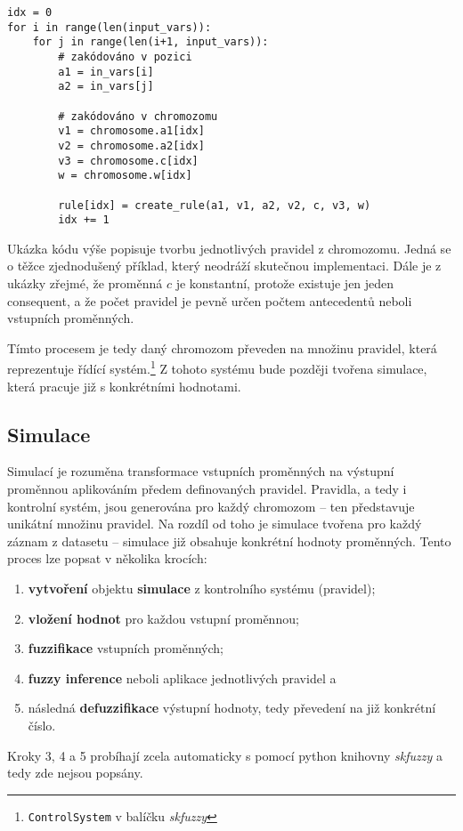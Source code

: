 \documentclass{article}
\begin{document}
\begin{listing}[H]
\begin{verbatim}
idx = 0
for i in range(len(input_vars)):
    for j in range(len(i+1, input_vars)):
        # zakódováno v pozici
        a1 = in_vars[i]
        a2 = in_vars[j]

        # zakódováno v chromozomu
        v1 = chromosome.a1[idx]
        v2 = chromosome.a2[idx]
        v3 = chromosome.c[idx]
        w = chromosome.w[idx]

        rule[idx] = create_rule(a1, v1, a2, v2, c, v3, w)
        idx += 1
\end{verbatim}
\caption{Ukázka kódu výše popisuje tvorbu jednotlivých pravidel z chromozomu. Jedná se o těžce zjednodušený příklad, který neodráží skutečnou implementaci. Dále je z ukázky zřejmé, že proměnná $c$ je konstantní, protože existuje jen jeden consequent, a že počet pravidel je pevně určen počtem antecedentů neboli vstupních proměnných.}
\label{lst:rule_creation}
\end{listing}

Tímto procesem je tedy daný chromozom převeden na množinu pravidel, která reprezentuje řídící systém.\footnote{\texttt{ControlSystem} v balíčku \emph{skfuzzy}} Z tohoto systému bude později tvořena simulace, která pracuje již s konkrétními hodnotami.

\subsection{Simulace}

Simulací je rozuměna transformace vstupních proměnných na výstupní proměnnou aplikováním předem definovaných pravidel. Pravidla, a tedy i kontrolní systém, jsou generována pro každý chromozom -- ten představuje unikátní množinu pravidel. Na rozdíl od toho je simulace tvořena pro každý záznam z datasetu -- simulace již obsahuje konkrétní hodnoty proměnných. Tento proces lze popsat v několika krocích:

\begin{enumerate}
    \samepage
    \item \textbf{vytvoření} objektu \textbf{simulace} z kontrolního systému (pravidel);
    \item \textbf{vložení hodnot} pro každou vstupní proměnnou;
    \item \textbf{fuzzifikace} vstupních proměnných;
    \item \textbf{fuzzy inference} neboli aplikace jednotlivých pravidel a
    \item následná \textbf{defuzzifikace} výstupní hodnoty, tedy převedení na již konkrétní číslo.
\end{enumerate}
Kroky 3, 4 a 5 probíhají zcela automaticky s pomocí python knihovny \emph{skfuzzy} a tedy zde nejsou popsány.
\end{document}
